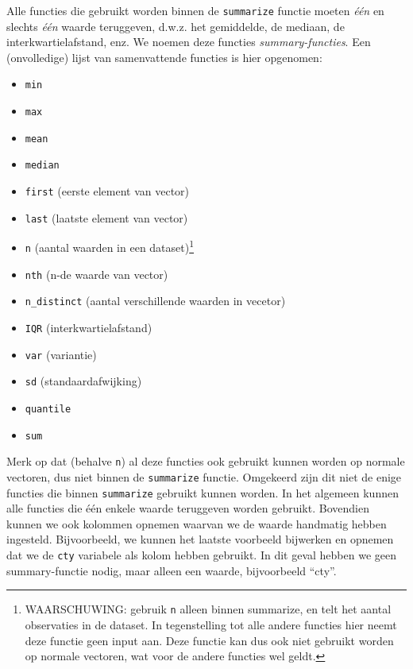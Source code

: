 \documentclass[]{tufte-book}
\newenvironment{Shaded}{}{}
\newcommand{\DataTypeTok}[1]{\textcolor[rgb]{0.56,0.13,0.00}{#1}}
\newcommand{\KeywordTok}[1]{\textcolor[rgb]{0.00,0.44,0.13}{\textbf{#1}}}
\newcommand{\NormalTok}[1]{#1}
\newcommand{\OperatorTok}[1]{\textcolor[rgb]{0.40,0.40,0.40}{#1}}
\newcommand{\StringTok}[1]{\textcolor[rgb]{0.25,0.44,0.63}{#1}}
\providecommand{\tightlist}{%
  \setlength{\itemsep}{0pt}\setlength{\parskip}{0pt}}
\begin{document}
Alle functies die gebruikt worden binnen de \texttt{summarize} functie moeten \emph{één} en slechts \emph{één} waarde teruggeven, d.w.z. het gemiddelde, de mediaan, de interkwartielafstand, enz. We noemen deze functies \emph{summary-functies}. Een (onvolledige) lijst van samenvattende functies is hier opgenomen:

\begin{itemize}
\tightlist
\item
  \texttt{min}
\item
  \texttt{max}
\item
  \texttt{mean}
\item
  \texttt{median}
\item
  \texttt{first} (eerste element van vector)
\item
  \texttt{last} (laatste element van vector)
\item
  \texttt{n} (aantal waarden in een dataset)\footnote{WAARSCHUWING: gebruik \texttt{n} alleen binnen summarize, en telt het aantal observaties in de dataset. In tegenstelling tot alle andere functies hier neemt deze functie geen input aan. Deze functie kan dus ook niet gebruikt worden op normale vectoren, wat voor de andere functies wel geldt.}
\item
  \texttt{nth} (n-de waarde van vector)
\item
  \texttt{n\_distinct} (aantal verschillende waarden in vecetor)
\item
  \texttt{IQR} (interkwartielafstand)
\item
  \texttt{var} (variantie)
\item
  \texttt{sd} (standaardafwijking)
\item
  \texttt{quantile}
\item
  \texttt{sum}
\end{itemize}

Merk op dat (behalve \texttt{n}) al deze functies ook gebruikt kunnen worden op normale vectoren, dus niet binnen de \texttt{summarize} functie. Omgekeerd zijn dit niet de enige functies die binnen \texttt{summarize} gebruikt kunnen worden. In het algemeen kunnen alle functies die één enkele waarde teruggeven worden gebruikt. Bovendien kunnen we ook kolommen opnemen waarvan we de waarde handmatig hebben ingesteld. Bijvoorbeeld, we kunnen het laatste voorbeeld bijwerken en opnemen dat we de \texttt{cty} variabele als kolom hebben gebruikt. In dit geval hebben we geen summary-functie nodig, maar alleen een waarde, bijvoorbeeld ``cty''.

\begin{Shaded}
\end{Shaded}
\end{document}
